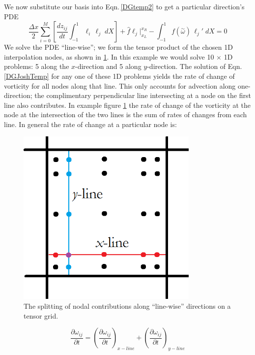 \documentclass[letterpaper,12pt]{report}
\newcommand{\be}{\begin{equation}}
\newcommand{\ben}[1]{\begin{equation}\label{#1}}
\newcommand{\ee}{\end{equation}}
\newcommand{\aomega}{\overset{\sim}{\omega}}				%
\begin{document}
We now substitute our basis into Eqn.\,\eqref{DGtemp2} to get a particular direction's PDE
\ben{DGJoshTemp} \frac{\Delta x}{2}	\sum_{i=0}^M \left[ \frac{d z_{ij}}{dt}	\int_{-1}^{1}\ell_i  \, \ell_j \;dX \right]
+\hat{f}\ell_j \Big|^{x_R}_{x_L} 
- \int_{-1}^{1} f(\aomega) \, \ell_j' \;dX = 0 \ee
We solve the PDE ``line-wise''; we form the tensor product of the chosen 1D interpolation nodes, as shown in \ref{fig:DGtensorSplit}. In this example we would solve 10 $\times$ 1D problems: 5 along the $x$-direction and 5 along $y$-direction. The solution of Eqn.\,\eqref{DGJoshTemp} for any one of these 1D problems yields the rate of change of vorticity for all nodes along that line. This only accounts for advection along one-direction; the complimentary perpendicular line intersecting at a node on the first line also contributes. In example figure \ref{fig:DGtensorSplit} the rate of change of the vorticity at the node at the intersection of the two lines is the sum of rates of changes from each line. In general the rate of change at a particular node is:

\begin{figure}
\centering
\includegraphics[width=3.5in]{lineDGelemDiag.PNG}
\caption{\label{fig:DGtensorSplit}The splitting of nodal contributions along ``line-wise'' directions on a tensor grid.}
\end{figure}

\be \frac{\partial \omega_{ij}}{\partial t} = (\frac{\partial \omega_{ij}}{\partial t})_{x-line} + (\frac{\partial \omega_{ij}}{\partial t})_{y-line} \ee

%
\end{document}
